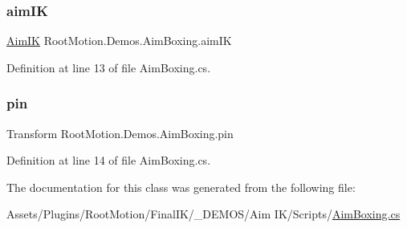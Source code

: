 \subsubsection{\texorpdfstring{aim\+IK}{aimIK}}
{\footnotesize\ttfamily \mbox{\hyperlink{class_root_motion_1_1_final_i_k_1_1_aim_i_k}{Aim\+IK}} Root\+Motion.\+Demos.\+Aim\+Boxing.\+aim\+IK}



Definition at line 13 of file Aim\+Boxing.\+cs.

\mbox{\label{class_root_motion_1_1_demos_1_1_aim_boxing_ad0580f75bac338543501c2efa2c039c3}} 
\subsubsection{\texorpdfstring{pin}{pin}}
{\footnotesize\ttfamily Transform Root\+Motion.\+Demos.\+Aim\+Boxing.\+pin}



Definition at line 14 of file Aim\+Boxing.\+cs.



The documentation for this class was generated from the following file\+:\begin{DoxyCompactItemize}
\item 
Assets/\+Plugins/\+Root\+Motion/\+Final\+I\+K/\+\_\+\+D\+E\+M\+O\+S/\+Aim I\+K/\+Scripts/\mbox{\hyperlink{_aim_boxing_8cs}{Aim\+Boxing.\+cs}}\end{DoxyCompactItemize}
